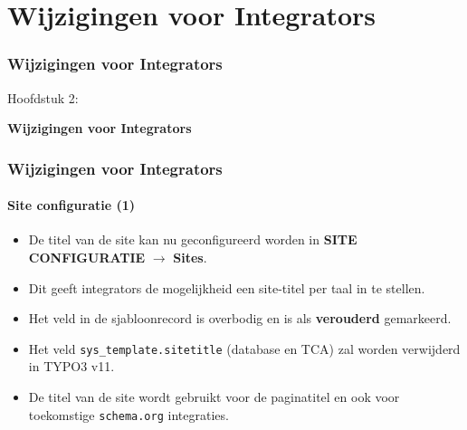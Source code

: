 %

\section{Wijzigingen voor Integrators}
\begin{frame}[fragile]
	\frametitle{Wijzigingen voor Integrators}

	\begin{center}\huge{Hoofdstuk 2:}\end{center}
	\begin{center}\huge{\color{typo3darkgrey}\textbf{Wijzigingen voor Integrators}}\end{center}

\end{frame}


\begin{frame}[fragile]
	\frametitle{Wijzigingen voor Integrators}
	\framesubtitle{Site configuratie (1)}

	\begin{itemize}

		\item De titel van de site kan nu geconfigureerd worden in
			\textbf{SITE CONFIGURATIE} $\rightarrow$ \textbf{Sites}.
		\item Dit geeft integrators de mogelijkheid een site-titel per taal in te stellen.
		\item Het veld in de sjabloonrecord is overbodig en is als \textbf{verouderd} gemarkeerd.
		\item Het veld \texttt{sys\_template.sitetitle} (database en TCA) zal worden verwijderd in TYPO3 v11.
		\item De titel van de site wordt gebruikt voor de paginatitel en ook voor toekomstige
			\texttt{schema.org} integraties.
	\end{itemize}

\end{frame}


